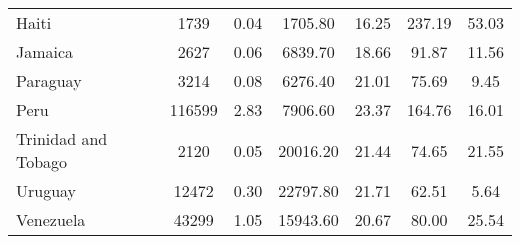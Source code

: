 \begin{table}[ht]
\begin{tabular}{l|cccccc}
  Haiti & 1739 & 0.04 & 1705.80 & 16.25 & 237.19 & 53.03 \\ 
  Jamaica & 2627 & 0.06 & 6839.70 & 18.66 & 91.87 & 11.56 \\ 
  Paraguay & 3214 & 0.08 & 6276.40 & 21.01 & 75.69 & 9.45 \\ 
  Peru & 116599 & 2.83 & 7906.60 & 23.37 & 164.76 & 16.01 \\ 
  Trinidad and Tobago & 2120 & 0.05 & 20016.20 & 21.44 & 74.65 & 21.55 \\ 
  Uruguay & 12472 & 0.30 & 22797.80 & 21.71 & 62.51 & 5.64 \\ 
  Venezuela & 43299 & 1.05 & 15943.60 & 20.67 & 80.00 & 25.54 \\ 
   \hline
\end{tabular}
\end{table}
